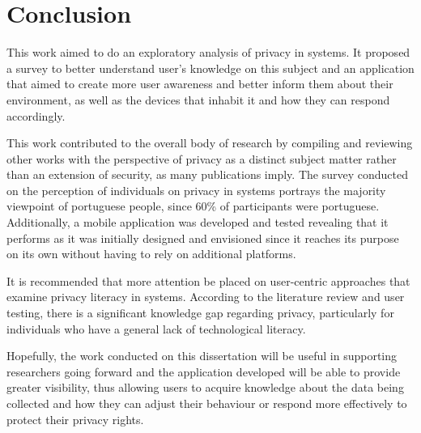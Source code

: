 %
%
\section{Conclusion}\label{section:conclusion}

This work aimed to do an exploratory analysis of privacy in \hyperlink{\acronym}{\acronym} systems.
It proposed a survey to better understand user's knowledge on this subject
and an application that aimed to create more user awareness and better inform
them about their environment, as well as the \hyperlink{\acronym}{\acronym} devices that inhabit it and
how they can respond accordingly.

This work contributed to the overall body of research by compiling and reviewing
other works with the perspective of privacy as a distinct subject matter rather than
an extension of security, as many publications imply. The survey conducted
on the perception of individuals on privacy in \hyperlink{\acronym}{\acronym} systems portrays the majority
viewpoint of portuguese people, since 60\% of participants were portuguese. Additionally,
a mobile application was developed and tested revealing that it performs as it was
initially designed and envisioned since it reaches its purpose on its own without having
to rely on additional platforms.

It is recommended that more attention be placed on user-centric approaches that
examine privacy literacy in \hyperlink{\acronym}{\acronym} systems. According to the literature review and
user testing, there is a significant knowledge gap regarding \hyperlink{\acronym}{\acronym} privacy, particularly
for individuals who have a general lack of technological literacy.

Hopefully, the work conducted on this dissertation will be useful in
supporting researchers going forward and the application developed will be able to
provide greater visibility, thus allowing users to acquire knowledge about
the data being collected and how they can adjust their behaviour or respond
more effectively to protect their privacy rights.
